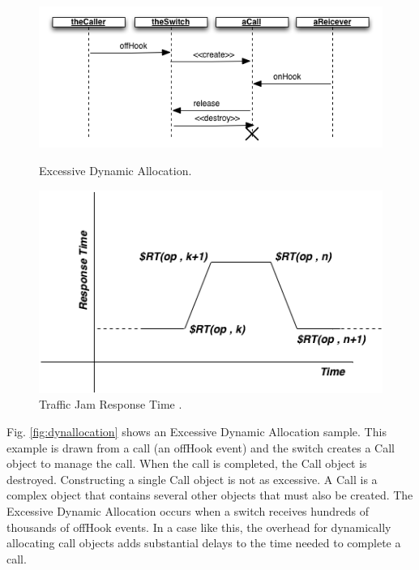 \documentclass[espaco=umemeio,chapter=TITLE,twoside,openright]{abnt}
\begin{document}
\begin{figure}[h]
\begin{minipage}{.5\textwidth}
\centering
\includegraphics[width=1\textwidth]{./images/excessivedynamicallocation.png}
\caption{Excessive Dynamic Allocation.}
\label{fig:dynallocation}
\end{minipage}
\begin{minipage}{.5\textwidth}
\centering
\includegraphics[width=1\textwidth]{./images/jam.png}
\caption{Traffic Jam Response Time \cite{Vetoio2011}.}
\label{fig:jam}
\end{minipage}
\end{figure}

Fig. \ref{fig:dynallocation} shows an Excessive Dynamic Allocation sample. This example is drawn from a call (an offHook event) and the switch creates a Call object to manage the call. When the call is completed, the Call object is destroyed. Constructing a single Call object is not as excessive. A Call is a complex object that contains several other objects that must also be created. The Excessive Dynamic Allocation occurs when a switch receives hundreds of thousands of offHook events. In a case like this, the overhead for dynamically allocating call objects adds substantial delays to the time needed to complete a call.
\end{document}
